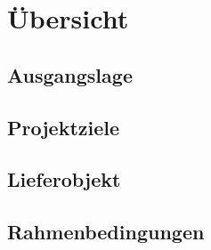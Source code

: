 \section{Übersicht} \label{sec:uebersicht}
\subsection{Ausgangslage}


\subsection{Projektziele} \label{subsec:projektziele}

\subsection{Lieferobjekt} \label{subsec:lieferobjekt}

\subsection{Rahmenbedingungen} \label{subsec:rahmenbedingungen}